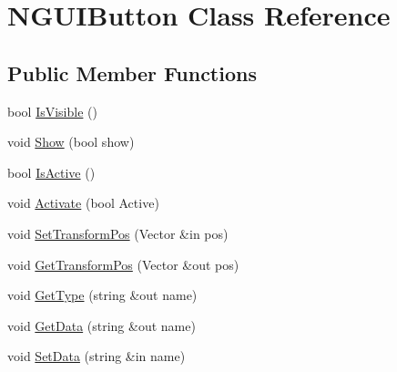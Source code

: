 \hypertarget{class_n_g_u_i_button}{}\section{N\+G\+U\+I\+Button Class Reference}
\label{class_n_g_u_i_button}
\subsection*{Public Member Functions}
\begin{DoxyCompactItemize}
\item 
bool \hyperlink{class_n_g_u_i_button_aeeccb1f0082a2b10949a4dc6ff534f9e}{Is\+Visible} ()
\item 
void \hyperlink{class_n_g_u_i_button_a448482fd025b3591a7e205dd4b65a8c3}{Show} (bool show)
\item 
bool \hyperlink{class_n_g_u_i_button_a9c6eaecb52db4ee60d7f6bd002e126f3}{Is\+Active} ()
\item 
void \hyperlink{class_n_g_u_i_button_af5f7bad04357746cb82281fce3215eaa}{Activate} (bool Active)
\item 
void \hyperlink{class_n_g_u_i_button_ad44bbaa90a9c14b42a0ce3442af1389a}{Set\+Transform\+Pos} (Vector \&in pos)
\item 
void \hyperlink{class_n_g_u_i_button_abafe0c6a13bf64a2dfda16ec804881cd}{Get\+Transform\+Pos} (Vector \&out pos)
\item 
void \hyperlink{class_n_g_u_i_button_a37d304dbd735ed24846d5735ef9b5eed}{Get\+Type} (string \&out name)
\item 
void \hyperlink{class_n_g_u_i_button_a06a8262af7a79c5e38310c601c2cb5ab}{Get\+Data} (string \&out name)
\item 
void \hyperlink{class_n_g_u_i_button_aa0362a3ecfd9919190462f57e4b67f41}{Set\+Data} (string \&in name)
\end{DoxyCompactItemize}
